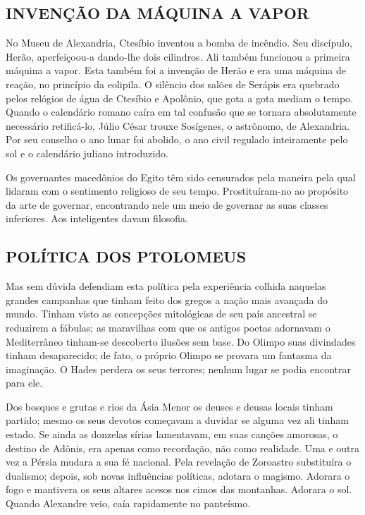 \documentclass[11pt,a5paper,twoside,openany]{book}
\begin{document}
\subsection*{INVENÇÃO DA MÁQUINA A VAPOR}
No Museu de Alexandria, Ctesíbio inventou a bomba de incêndio. Seu discípulo, Herão, aperfeiçoou-a dando-lhe dois cilindros. Ali também funcionou a primeira máquina a vapor. Esta também foi a invenção de Herão e era uma máquina de reação, no princípio da eolipila. O silêncio dos salões de Serápis era quebrado pelos relógios de água de Ctesíbio e Apolônio, que gota a gota mediam o tempo. Quando o calendário romano caíra em tal confusão que se tornara absolutamente necessário retificá-lo, Júlio César trouxe Sosígenes, o astrônomo, de Alexandria. Por seu conselho o ano lunar foi abolido, o ano civil regulado inteiramente pelo sol e o calendário juliano introduzido.

Os governantes macedônios do Egito têm sido censurados pela maneira pela qual lidaram com o sentimento religioso de seu tempo. Prostituíram-no ao propósito da arte de governar, encontrando nele um meio de governar as suas classes inferiores. Aos inteligentes davam filosofia.

\subsection*{POLÍTICA DOS PTOLOMEUS}
Mas sem dúvida defendiam esta política pela experiência colhida naquelas grandes campanhas que tinham feito dos gregos a nação mais avançada do mundo. Tinham visto as concepções mitológicas de seu país ancestral se reduzirem a fábulas; as maravilhas com que os antigos poetas adornavam o Mediterrâneo tinham-se descoberto ilusões sem base. Do Olimpo suas divindades tinham desaparecido; de fato, o próprio Olimpo se provara um fantasma da imaginação. O Hades perdera os seus terrores; nenhum lugar se podia encontrar para ele.

Dos bosques e grutas e rios da Ásia Menor os deuses e deusas locais tinham partido; mesmo os seus devotos começavam a duvidar se alguma vez ali tinham estado. Se ainda as donzelas sírias lamentavam, em suas canções amorosas, o destino de Adônis, era apenas como recordação, não como realidade. Uma e outra vez a Pérsia mudara a sua fé nacional. Pela revelação de Zoroastro substituíra o dualismo; depois, sob novas influências políticas, adotara o magismo. Adorara o fogo e mantivera os seus altares acesos nos cimos das montanhas. Adorara o sol. Quando Alexandre veio, caía rapidamente no panteísmo.
\end{document}
